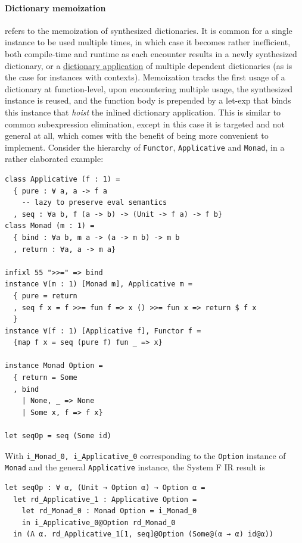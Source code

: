\documentclass[a4paper, 11pt]{article}
\theoremstyle{remark}\newtheorem*{remark}{Remark}
\theoremstyle{definition}\newtheorem*{definition}{Definition}
\begin{document}
\paragraph{Dictionary memoization} refers to the memoization of synthesized dictionaries. It is common
for a single instance to be used multiple times, in which case it becomes rather inefficient, both compile-time
and runtime as each encounter results in a newly synthesized dictionary,
or a \underline{dictionary application} of multiple dependent dictionaries
(as is the case for instances with contexts).
Memoization tracks the first usage of a dictionary at function-level, upon encountering multiple usage,
the synthesized instance is reused, and
the function body is prepended by a let-exp that binds this instance
that \emph{hoist} the inlined dictionary application.
This is similar to common subexpression elimination, except in this case it is targeted and not general at all,
which comes with the benefit of being more convenient to implement. Consider the hierarchy of
\texttt{Functor}, \texttt{Applicative} and \texttt{Monad}, in a rather elaborated example:

\begin{verbatim}
class Applicative (f : 1) =
  { pure : ∀ a, a -> f a
    -- lazy to preserve eval semantics
  , seq : ∀a b, f (a -> b) -> (Unit -> f a) -> f b}
class Monad (m : 1) =
  { bind : ∀a b, m a -> (a -> m b) -> m b
  , return : ∀a, a -> m a}

infixl 55 ">>=" => bind
instance ∀(m : 1) [Monad m], Applicative m =
  { pure = return
  , seq f x = f >>= fun f => x () >>= fun x => return $ f x
  }
instance ∀(f : 1) [Applicative f], Functor f =
  {map f x = seq (pure f) fun _ => x}

instance Monad Option =
  { return = Some
  , bind
    | None, _ => None
    | Some x, f => f x}

let seqOp = seq (Some id)
\end{verbatim}

With \texttt{i\_Monad\_0, i\_Applicative\_0} corresponding to the \texttt{Option} instance of
\texttt{Monad} and the general \texttt{Applicative} instance, the System F IR result is

\begin{verbatim}
let seqOp : ∀ α, (Unit → Option α) → Option α =
  let rd_Applicative_1 : Applicative Option =
    let rd_Monad_0 : Monad Option = i_Monad_0
    in i_Applicative_0@Option rd_Monad_0
  in (Λ α. rd_Applicative_1[1, seq]@Option (Some@(α → α) id@α))
\end{verbatim}
\end{document}
